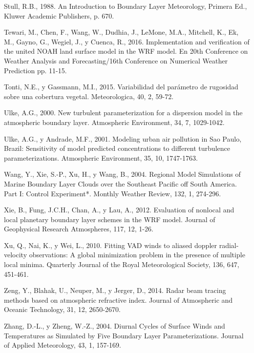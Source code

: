 \documentclass[12pt,spanish,oneside]{book}
\begin{document}
\hypertarget{ref-Stull1988}{}
Stull, R.B., 1988. An Introduction to Boundary Layer Meteorology,
Primera Ed., Kluwer Academic Publishers, p. 670.

\hypertarget{ref-Tewari2004}{}
Tewari, M., Chen, F., Wang, W., Dudhia, J., LeMone, M.A., Mitchell, K.,
Ek, M., Gayno, G., Wegiel, J., y Cuenca, R., 2016. Implementation and
verification of the united NOAH land surface model in the WRF model. En
20th Conference on Weather Analysis and Forecasting/16th Conference on
Numerical Weather Prediction pp. 11-15.

\hypertarget{ref-Tonti2015}{}
Tonti, N.E., y Gassmann, M.I., 2015. Variabilidad del parámetro de
rugosidad sobre una cobertura vegetal. Meteorologica, 40, 2, 59-72.

\hypertarget{ref-Ulke2000}{}
Ulke, A.G., 2000. New turbulent parameterization for a dispersion model
in the atmospheric boundary layer. Atmospheric Environment, 34, 7,
1029-1042.

\hypertarget{ref-Ulke2001}{}
Ulke, A.G., y Andrade, M.F., 2001. Modeling urban air pollution in Sao
Paulo, Brazil: Sensitivity of model predicted concentrations to
different turbulence parameterizations. Atmospheric Environment, 35, 10,
1747-1763.

\hypertarget{ref-Wang2004}{}
Wang, Y., Xie, S.-P., Xu, H., y Wang, B., 2004. Regional Model
Simulations of Marine Boundary Layer Clouds over the Southeast Pacific
off South America. Part I: Control Experiment*. Monthly Weather Review,
132, 1, 274-296.

\hypertarget{ref-Xie2012}{}
Xie, B., Fung, J.C.H., Chan, A., y Lau, A., 2012. Evaluation of nonlocal
and local planetary boundary layer schemes in the WRF model. Journal of
Geophysical Research Atmospheres, 117, 12, 1-26.

\hypertarget{ref-Xu2010}{}
Xu, Q., Nai, K., y Wei, L., 2010. Fitting VAD winds to aliased doppler
radial-velocity observations: A global minimization problem in the
presence of multiple local minima. Quarterly Journal of the Royal
Meteorological Society, 136, 647, 451-461.

\hypertarget{ref-Zeng2014}{}
Zeng, Y., Blahak, U., Neuper, M., y Jerger, D., 2014. Radar beam tracing
methods based on atmospheric refractive index. Journal of Atmospheric
and Oceanic Technology, 31, 12, 2650-2670.

\hypertarget{ref-Zhang2004}{}
Zhang, D.-L., y Zheng, W.-Z., 2004. Diurnal Cycles of Surface Winds and
Temperatures as Simulated by Five Boundary Layer Parameterizations.
Journal of Applied Meteorology, 43, 1, 157-169.
\end{document}
